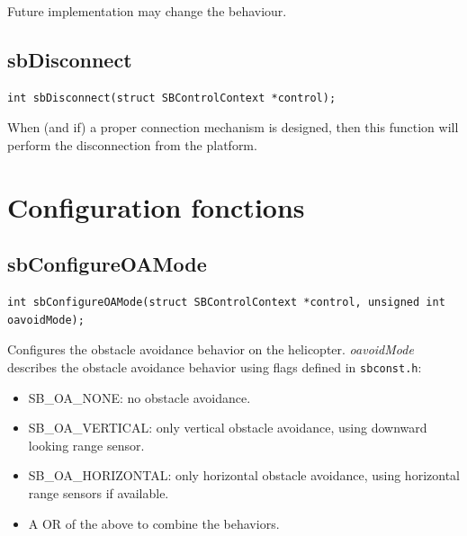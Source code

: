 \documentclass{article}
\begin{document}
Future implementation may change the behaviour.

\subsection{sbDisconnect}
\label{sec:sbDisconnect}
\begin{verbatim}
int sbDisconnect(struct SBControlContext *control);
\end{verbatim}
When (and if) a proper connection mechanism is designed, then this function
will perform the disconnection from the platform.

\section{Configuration fonctions}
\label{sec:configuration}
\subsection{sbConfigureOAMode}
\label{sec:sbConfigureOAMode}
\begin{verbatim}
int sbConfigureOAMode(struct SBControlContext *control, unsigned int oavoidMode);
\end{verbatim}
Configures the obstacle avoidance behavior on the helicopter.
{\em oavoidMode} describes the obstacle avoidance behavior using flags defined
in {\tt sbconst.h}:
\begin{itemize}
\item SB\_OA\_NONE: no obstacle avoidance.
\item SB\_OA\_VERTICAL: only vertical obstacle avoidance, using downward
looking range sensor.
\item SB\_OA\_HORIZONTAL: only horizontal obstacle avoidance, using horizontal
range sensors if available.
\item A OR of the above to combine the behaviors.
\end{itemize}
\end{document}
